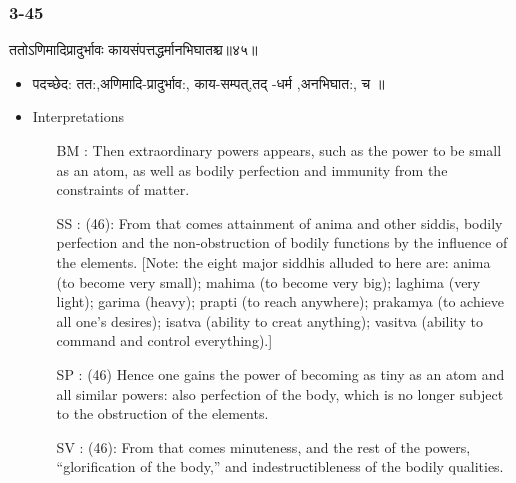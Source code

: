 \begin{frame}[fragile]\frametitle{3-45}
\begin{sanskrit}
ततोऽणिमादिप्रादुर्भावः कायसंपत्तद्धर्मानभिघातश्च॥४५॥
\end{sanskrit}

	\begin{itemize}
	\item पदच्छेद:  तत:,अणिमादि-प्रादुर्भाव:, काय-सम्पत्,तद् -धर्म ,अनभिघात:, च ॥
	\item Interpretations
		\begin{itemize}	

		\item [BM]: Then extraordinary powers appears, such as the power to be small as an atom, as well as bodily perfection and immunity from the constraints of matter.
		\item [SS]: (46): From that comes attainment of anima and other siddis, bodily perfection and the non-obstruction of bodily functions by the influence of the elements. [Note: the eight major siddhis alluded to here are: anima (to become very small); mahima (to become very big); laghima (very light); garima (heavy); prapti (to reach anywhere); prakamya (to achieve all one’s desires); isatva (ability to creat anything); vasitva (ability to command and control everything).]
		\item [SP]: (46) Hence one gains the power of becoming as tiny as an atom and all similar powers: also perfection of the body, which is no longer subject to the obstruction of the elements.
		\item [SV]: (46): From that comes minuteness, and the rest of the powers, “glorification of the body,” and indestructibleness of the bodily qualities. 
		\end{itemize}
	\end{itemize}
\end{frame}



